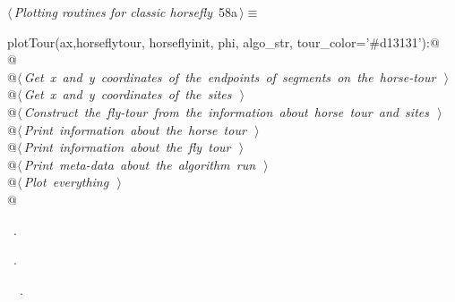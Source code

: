 \documentclass[11.5pt]{report}
\begin{document}
\begin{flushleft} \small\label{scrap84}\raggedright\small
{} $\langle\,${\itshape Plotting routines for classic horsefly}\nobreak\ {\footnotesize {58a}}$\,\rangle\equiv$
\vspace{-1ex}
\begin{list}{}{} \item
\mbox{}\verb@def plotTour(ax,horseflytour, horseflyinit, phi, algo_str, tour_color='#d13131'):@\\
\mbox{}\verb@   @\\
\mbox{}\verb@    @\hbox{$\langle\,${\itshape Get x and y coordinates of the endpoints of segments on the horse-tour}\nobreak\ {\footnotesize {}}$\,\rangle$}\verb@@\\
\mbox{}\verb@    @\hbox{$\langle\,${\itshape Get x and y coordinates of the sites}\nobreak\ {\footnotesize {}}$\,\rangle$}\verb@@\\
\mbox{}\verb@    @\hbox{$\langle\,${\itshape Construct the fly-tour from the information about horse tour and sites}\nobreak\ {\footnotesize {}}$\,\rangle$}\verb@@\\
\mbox{}\verb@    @\hbox{$\langle\,${\itshape Print information about the horse tour}\nobreak\ {\footnotesize {}}$\,\rangle$}\verb@@\\
\mbox{}\verb@    @\hbox{$\langle\,${\itshape Print information about the fly tour}\nobreak\ {\footnotesize {}}$\,\rangle$}\verb@@\\
\mbox{}\verb@    @\hbox{$\langle\,${\itshape Print meta-data about the algorithm run}\nobreak\ {\footnotesize {}}$\,\rangle$}\verb@@\\
\mbox{}\verb@    @\hbox{$\langle\,${\itshape Plot everything}\nobreak\ {\footnotesize {}}$\,\rangle$}\verb@@\\
\mbox{}\verb@    @{\NWsep}
\end{list}
\vspace{-1.5ex}
\footnotesize
\begin{list}{}{\setlength{\itemsep}{-\parsep}\setlength{\itemindent}{-\leftmargin}}
\item \NWtxtMacroDefBy\ .
\item \NWtxtMacroRefIn\ .
\item \NWtxtIdentsDefed\nobreak\  \verb@plotTour@\nobreak\ .
\item{}
\end{list}
\vspace{4ex}
\end{flushleft}
\end{document}
